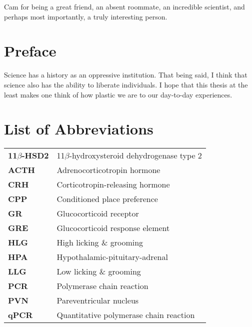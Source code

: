 \documentclass[12pt,twoside]{reedthesis}
\begin{document}
	Cam for being a great friend, an absent roommate, an incredible scientist, and perhaps most importantly, a truly interesting person.
	

    \chapter*{Preface}
	Science has a history as an oppressive institution. That being said, I think
  that science also has the ability to liberate individuals. I hope that this
  thesis at the least makes one think of how plastic we are to our day-to-day experiences.

    \chapter*{List of Abbreviations}

	\begin{table}[h]
	\centering %
	\begin{tabular}{ll}
    \textbf{11$\beta$-HSD2} & 11$\beta$-hydroxysteroid dehydrogenase type 2\\
    \textbf{ACTH} & Adrenocorticotropin hormone\\
    \textbf{CRH} & Corticotropin-releasing hormone \\
    \textbf{CPP} & Conditioned place preference\\
    \textbf{GR} & Glucocorticoid receptor \\
    \textbf{GRE} & Glucocorticoid response element \\
    \textbf{HLG} & High licking \& grooming \\
    \textbf{HPA} & Hypothalamic-pituitary-adrenal \\
    \textbf{LLG} & Low licking \& grooming \\
    \textbf{PCR} & Polymerase chain reaction\\
    \textbf{PVN} & Pareventricular nucleus \\
    \textbf{qPCR} & Quantitative polymerase chain reaction\\
	\end{tabular}
	\end{table}
	

    \tableofcontents
    \listoftables
    \listoffigures

\end{document}
